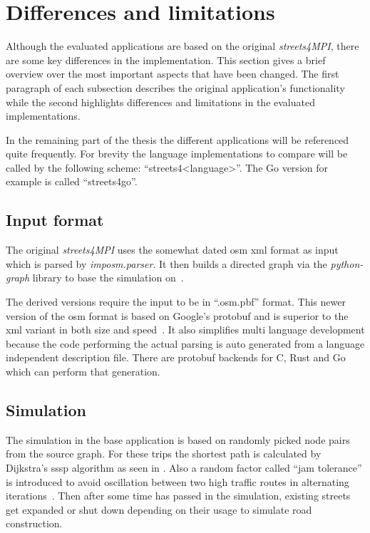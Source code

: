 \section{Differences and limitations}
\label{sec:Concept::Differences}

Although the evaluated applications are based on the original \textit{streets4MPI}, there are some key differences in the implementation. This section gives a brief overview over the most important aspects that have been changed. The first paragraph of each subsection describes the original application's functionality while the second highlights differences and limitations in the evaluated implementations.

In the remaining part of the thesis the different applications will be referenced quite frequently. For brevity the language implementations to compare will be called by the following scheme: ``streets4<language>''. The Go version for example is called ``streets4go''.

\subsection*{Input format}
\label{subsec:Concept::Differences::Input}

The original \textit{streets4MPI} uses the somewhat dated \gls{osm} \gls{xml} format as input which is parsed by \textit{imposm.parser}. It then builds a directed graph via the \textit{python-graph} library to base the simulation on~\cite{streets_report}.

The derived versions require the input to be in ``.osm.pbf'' format. This newer version of the \gls{osm} format is based on Google's \gls{protobuf} and is superior to the \gls{xml} variant in both size and speed~\cite{osm_wiki_pbf}. It also simplifies multi language development because the code performing the actual parsing is auto generated from a language independent description file. There are \gls{protobuf} backends for C, Rust and Go which can perform that generation.

\subsection*{Simulation}
\label{subsec:Concept::Differences::Simulation}

The simulation in the base application is based on randomly picked node pairs from the source graph. For these trips the shortest path is calculated by Dijkstra's \gls{sssp} algorithm as seen in \cite{cormen}. Also a random factor called ``jam tolerance'' is introduced to avoid oscillation between two high traffic routes in alternating iterations~\cite{streets_report}. Then after some time has passed in the simulation, existing streets get expanded or shut down depending on their usage to simulate road construction.

